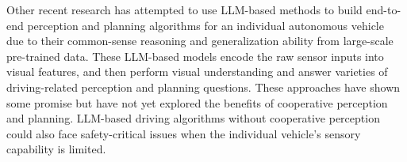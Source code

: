 Other recent research has attempted to use LLM-based methods to build end-to-end perception and planning algorithms for an individual autonomous vehicle~\cite{sima2023drivelm, tian2024drivevlm, wang2024omnidrive, tian2024token, chen2024drivingwithllms, nie2023reason2drive, wang2023drivemlm, xu2023drivegpt4} due to their common-sense reasoning and generalization ability from large-scale pre-trained data. These LLM-based models encode the raw sensor inputs
into visual features, and then perform visual understanding and answer varieties of driving-related perception and planning questions. These approaches have shown some promise but have not yet explored the benefits of cooperative perception and planning. LLM-based driving algorithms without cooperative perception could also face safety-critical issues when the individual vehicle's sensory capability is limited.


